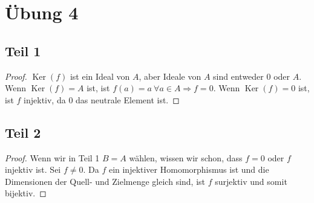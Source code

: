\documentclass[10pt,a4paper]{article}
\DeclareMathOperator{\Ker}{Ker}
\begin{document}
\section*{Übung 4}

\subsection*{Teil 1}

\begin{proof}
$\Ker(f)$ ist ein Ideal von $A$, aber Ideale von $A$ sind entweder $0$ oder $A$.
Wenn $\Ker(f) = A$ ist, ist $f(a) = a\ \forall a \in A \Rightarrow f = 0$.
Wenn $\Ker(f) = 0$ ist, ist $f$ injektiv, da $0$ das neutrale Element ist.
\end{proof}

\subsection*{Teil 2}

\begin{proof}
Wenn wir in Teil 1 $B = A$ wählen, wissen wir schon, dass $f = 0$ oder $f$ injektiv ist.
Sei $f \ne 0$.
Da $f$ ein injektiver Homomorphismus ist und die Dimensionen der Quell- und Zielmenge gleich sind, ist $f$ surjektiv und somit bijektiv.
\end{proof}
\end{document}
